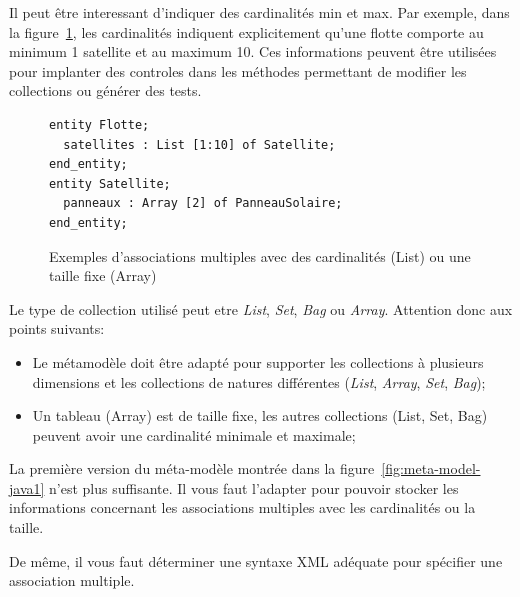 \documentclass[12pt]{article}
\begin{document}
Il peut être interessant d'indiquer des cardinalités min et max. Par exemple, dans la figure~\ref{fig:exemple-minispec4}, les cardinalités indiquent explicitement qu'une flotte comporte au minimum 1 satellite et au maximum 10. Ces informations peuvent être utilisées pour implanter des controles dans les méthodes permettant de modifier les collections ou générer des tests.
\begin{figure}
\begin{lstlisting}[language=express]
entity Flotte;
  satellites : List [1:10] of Satellite;
end_entity;
entity Satellite;
  panneaux : Array [2] of PanneauSolaire; 
end_entity;
\end{lstlisting}
\caption{Exemples d'associations multiples avec des cardinalités (List) ou une taille fixe (Array)}
\label{fig:exemple-minispec4}
\end{figure}

Le type de collection utilisé peut etre \textit{List}, \textit{Set}, \textit{Bag} ou \textit{Array}. Attention donc aux points suivants:
\begin{itemize}
	\item Le métamodèle doit être adapté pour supporter les collections à plusieurs dimensions et les collections de natures différentes (\textit{List}, \textit{Array}, \textit{Set}, \textit{Bag});
	\item Un tableau (Array) est de taille fixe, les autres collections (List, Set, Bag) peuvent avoir une cardinalité minimale et maximale;	
\end{itemize}

La première version du méta-modèle montrée dans la figure~\ref{fig:meta-model-java1} n'est plus suffisante. Il vous faut l'adapter pour pouvoir stocker les informations concernant les associations multiples avec les cardinalités ou la taille. 

De même, il vous faut déterminer une syntaxe XML adéquate pour spécifier une association multiple.

%
%
\end{document}
